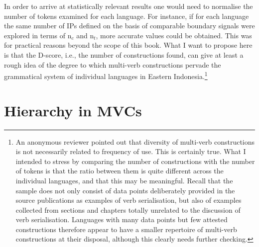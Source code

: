 \largerpage[-2]
In order to arrive at statistically relevant results one would need to normalise the number of tokens examined for each language. For instance, if for each language the same number of IPs defined on the basis of comparable boundary signals were explored in terms of n$_c$ and n$_t$, more accurate values could be obtained. This was for practical reasons beyond the scope of this book. What I want to propose here is that the D-score, i.e., the number of constructions found, can give at least a rough idea of the degree to which multi-verb constructions pervade the grammatical system of individual languages in Eastern Indonesia.\footnote{An anonymous reviewer pointed out that diversity of multi-verb constructions is not necessarily related to frequency of use. This is certainly true. What I intended to stress by comparing the number of constructions with the number of tokens is that the ratio between them is quite different across the individual languages, and that this may be meaningful. Recall that the sample does not only consist of data points deliberately provided in the source publications as examples of verb serialisation, but also of examples collected from sections and chapters totally unrelated to the discussion of verb serialisation. Languages with many data points but few attested constructions therefore appear to have a smaller repertoire of multi-verb constructions at their disposal, although this clearly needs further checking.}

\section{Hierarchy in MVCs} \label{sec:hierarchy}


